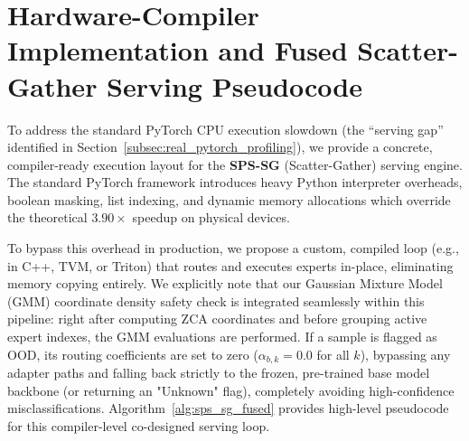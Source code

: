 \documentclass{article}
\theoremstyle{plain}
\theoremstyle{definition}
\theoremstyle{remark}
\begin{document}










\newpage
\appendix
\onecolumn

\section{Hardware-Compiler Implementation and Fused Scatter-Gather Serving Pseudocode}
\label{sec:appendix_pseudocode}

To address the standard PyTorch CPU execution slowdown (the ``serving gap'' identified in Section~\ref{subsec:real_pytorch_profiling}), we provide a concrete, compiler-ready execution layout for the \textbf{SPS-SG} (Scatter-Gather) serving engine. The standard PyTorch framework introduces heavy Python interpreter overheads, boolean masking, list indexing, and dynamic memory allocations which override the theoretical $3.90\times$ speedup on physical devices.

To bypass this overhead in production, we propose a custom, compiled loop (e.g., in C++, TVM, or Triton) that routes and executes experts in-place, eliminating memory copying entirely. We explicitly note that our Gaussian Mixture Model (GMM) coordinate density safety check is integrated seamlessly within this pipeline: right after computing ZCA coordinates and before grouping active expert indexes, the GMM evaluations are performed. If a sample is flagged as OOD, its routing coefficients are set to zero ($\alpha_{b, k} = 0.0$ for all $k$), bypassing any adapter paths and falling back strictly to the frozen, pre-trained base model backbone (or returning an "Unknown" flag), completely avoiding high-confidence misclassifications. Algorithm~\ref{alg:sps_sg_fused} provides high-level pseudocode for this compiler-level co-designed serving loop.
\end{document}
